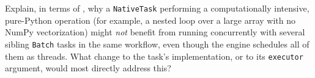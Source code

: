 \begin{exercise}
Explain, in terms of , why a
\texttt{NativeTask} performing a computationally intensive, pure-Python
operation (for example, a nested loop over a large array with no NumPy
vectorization) might \emph{not} benefit from running concurrently with
several sibling \texttt{Batch} tasks in the same workflow, even though the
engine schedules all of them as threads. What change to the task's
implementation, or to its \texttt{executor} argument, would most directly
address this?
\end{exercise}
